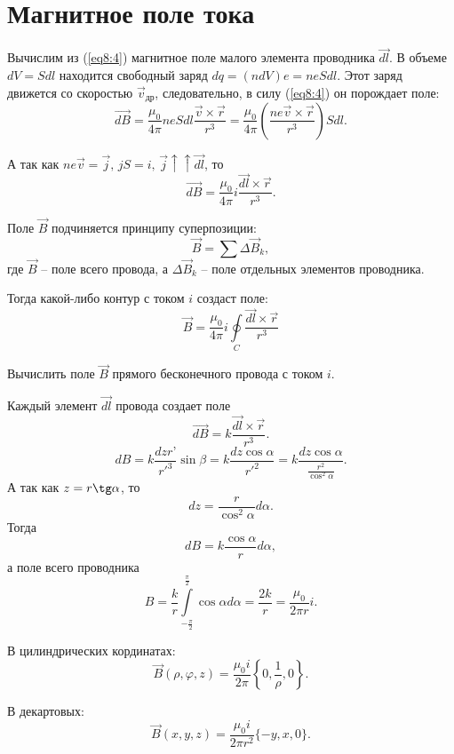 \section{Магнитное поле тока}
    Вычислим из (\ref{eq8:4}) магнитное поле малого элемента проводника
    \( \vec{dl} \). В объеме \( dV = Sdl \) находится свободный заряд
    \( dq = (ndV)e = neSdl \). Этот заряд движется со скоростью
    \( \vec{v}_{\textit{др}} \), следовательно, в силу (\ref{eq8:4}) он
    порождает поле:
    \[
        \vec{dB} = \frac{\mu_0}{4\pi}neSdl\frac{\vec{v}\times\vec{r}}{r^3} =
        \frac{\mu_0}{4\pi} \left(\frac{ne\vec{v}\times\vec{r}}{r^3}\right)Sdl.
    \]
    
    А так как \( ne\vec{v} = \vec{j}, \, jS = i, \,
    \vec{j} \uparrow\uparrow \vec{dl} \), то
    \begin{equation}
        \vec{dB} = \frac{\mu_0}{4\pi} i \frac{\vec{dl}\times\vec{r}}{r^3}.
        \label{eq8:5}
    \end{equation}
    
    Поле \( \vec{B} \) подчиняется принципу суперпозиции:
    \[
        \vec{B} = \sum \Delta\vec{B}_k,
    \]
    где \( \vec{B} \) -- поле всего провода, а \( \Delta\vec{B}_k \) -- поле
    отдельных элементов проводника.
    
    Тогда какой-либо контур с током \( i \) создаст поле:
    \begin{equation}
        \vec{B} = \frac{\mu_0}{4\pi} i \oint\limits_C \frac{\vec{dl}\times
        \vec{r}}{r^3} 
        \label{eq8:6}
    \end{equation}
    
    \begin{example}
        Вычислить поле \( \vec{B} \) прямого бесконечного провода с током
        \( i \).
    \end{example}
    
    \begin{solution}
        Каждый элемент \( \vec{dl} \) провода создает поле
        \[
            \vec{dB} = k\frac{\vec{dl}\times\vec{r}}{r^3}.
        \]
        \[
            dB = k\frac{dz r’}{r'^3}\sin\beta = k\frac{dz\cos\alpha}{r'^2} = 
            k\frac{dz\cos\alpha}{ \frac{r^2}{\cos^2\alpha} }.
        \]
        А так как \( z = r\tg\alpha \), то
        \[
            dz = \frac{r}{\cos^2\alpha}d\alpha.
        \]
        Тогда
        \[ dB = k\frac{\cos\alpha}{r}d\alpha, \]
        а поле всего проводника
        \[
            B = \frac{k}{r} \int\limits_{ -\frac{\pi}{2} }^{ \frac{\pi}{2} }
            \cos\alpha d\alpha = \frac{2k}{r} = \frac{\mu_0}{2\pi r}i.
        \]
        
        В цилиндрических кординатах:
        \[
            \vec{B}(\rho, \varphi, z) =
            \frac{\mu_0 i}{2\pi}\left\{0, \frac{1}{\rho}, 0\right\}.
        \]
        
        В декартовых:
        \[
            \vec{B}(x, y, z) = \frac{\mu_0 i}{2\pi r^2}\{ -y, x, 0 \}.
        \]
    \end{solution}
    
